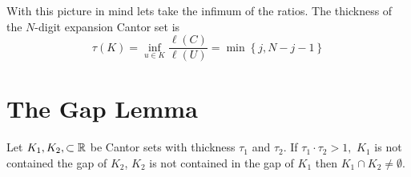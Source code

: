 \begin{example}
    With this picture in mind lets take the infimum of the ratios.  The thickness of the $N$\hyphen{digit} expansion Cantor set is 
    $$\tau(K) = \inf_{u\in K}\frac{\ell(C)}{\ell(U)} = \min\left\{j,N-j-1\right\}$$
\end{example}  
\section{The Gap Lemma}
\begin{lemma}
    Let $K_1, K_2, \subset \mathbb{R}$ be Cantor sets with thickness $\tau_1$ and  $\tau_2$.  If $\tau_1 \cdot \tau_2 >1,$  $K_1$ is not contained the gap of $K_2$, $K_2$ is not contained in the gap of $K_1$ then $K_1 \cap K_2 \neq \emptyset.$
\end{lemma}
